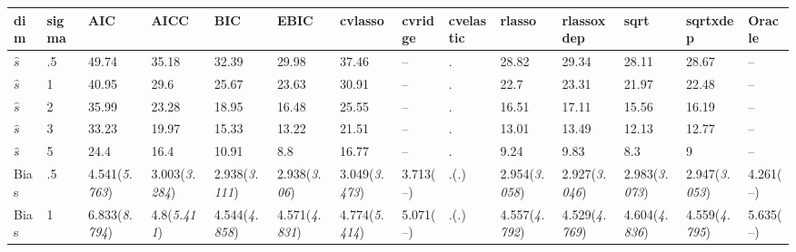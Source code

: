 \documentclass{article}
\begin{document}
\begin{table}[tbp] \centering
{}

{\tiny
\begin{tabularx}{\textwidth}{lCCCCCCCCCCCCC}

\toprule
{dim}&{sigma}&{AIC}&{AICC}&{BIC}&{EBIC}&{cvlasso}&{cvridge}&{cvelastic}&{rlasso}&{rlassoxdep}&{sqrt}&{sqrtxdep}&{Oracle} \tabularnewline
\midrule\addlinespace[1.5ex]
$\hat{s}$&.5&49.74&35.18&32.39&29.98&37.46&--&.&28.82&29.34&28.11&28.67&-- \tabularnewline
$\hat{s}$&1&40.95&29.6&25.67&23.63&30.91&--&.&22.7&23.31&21.97&22.48&-- \tabularnewline
$\hat{s}$&2&35.99&23.28&18.95&16.48&25.55&--&.&16.51&17.11&15.56&16.19&-- \tabularnewline
$\hat{s}$&3&33.23&19.97&15.33&13.22&21.51&--&.&13.01&13.49&12.13&12.77&-- \tabularnewline
$\hat{s}$&5&24.4&16.4&10.91&8.8&16.77&--&.&9.24&9.83&8.3&9&-- \tabularnewline
\midrule Bias&.5&4.541\newline (\emph{5.763})&3.003\newline (\emph{3.284})&2.938\newline (\emph{3.111})&2.938\newline (\emph{3.06})&3.049\newline (\emph{3.473})&3.713\newline (--)&.\newline (\emph{.})&2.954\newline (\emph{3.058})&2.927\newline (\emph{3.046})&2.983\newline (\emph{3.073})&2.947\newline (\emph{3.053})&4.261\newline (--) \tabularnewline
Bias&1&6.833\newline (\emph{8.794})&4.8\newline (\emph{5.411})&4.544\newline (\emph{4.858})&4.571\newline (\emph{4.831})&4.774\newline (\emph{5.414})&5.071\newline (--)&.\newline (\emph{.})&4.557\newline (\emph{4.792})&4.529\newline (\emph{4.769})&4.604\newline (\emph{4.836})&4.559\newline (\emph{4.795})&5.635\newline (--) \tabularnewline

\end{tabularx}}
\end{table}
\end{document}
